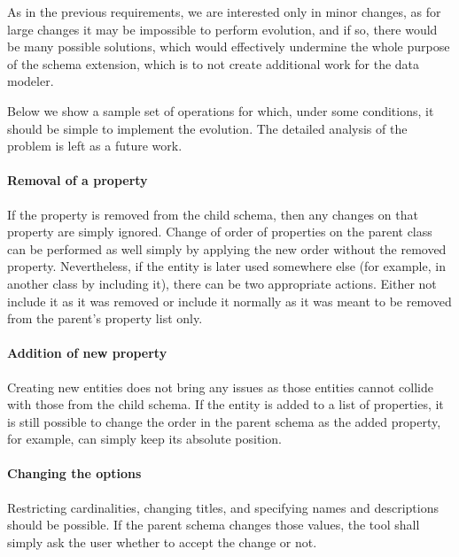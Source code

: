 As in the previous requirements, we are interested only in minor changes, as for large changes it may be impossible to perform evolution, and if so, there would be many possible solutions, which would effectively undermine the whole purpose of the schema extension, which is to not create additional work for the data modeler.

Below we show a sample set of operations for which, under some conditions, it should be simple to implement the evolution. The detailed analysis of the problem is left as a future work.

\paragraph{Removal of a property} If the property is removed from the child schema, then any changes on that property are simply ignored. Change of order of properties on the parent class can be performed as well simply by applying the new order without the removed property. Nevertheless, if the entity is later used somewhere else (for example, in another class by including it), there can be two appropriate actions. Either not include it as it was removed or include it normally as it was meant to be removed from the parent's property list only.

\paragraph{Addition of new property} Creating new entities does not bring any issues as those entities cannot collide with those from the child schema. If the entity is added to a list of properties, it is still possible to change the order in the parent schema as the added property, for example, can simply keep its absolute position.

\paragraph{Changing the options} Restricting cardinalities, changing titles, and specifying names and descriptions should be possible. If the parent schema changes those values, the tool shall simply ask the user whether to accept the change or not.

